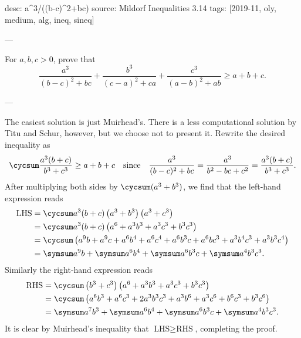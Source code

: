 desc: a^3/((b-c)^2+bc)
source: Mildorf Inequalities 3.14
tags: [2019-11, oly, medium, alg, ineq, sineq]

---

For $a,b,c>0$, prove that \[\frac{a^3}{(b-c)^2+bc}+\frac{b^3}{(c-a)^2+ca}+\frac{c^3}{(a-b)^2+ab}\ge a+b+c.\]

---

The easiest solution is just Muirhead's. There is a less computational solution by Titu and Schur, however, but we choose not to present it. Rewrite the desired inequality as \[\cycsum\frac{a^3(b+c)}{b^3+c^3}\ge a+b+c\quad\text{since}\quad\frac{a^3}{(b-c)^2+bc}=\frac{a^3}{b^2-bc+c^2}=\frac{a^3(b+c)}{b^3+c^3}.\]
After multiplying both sides by $\cycsum(a^3+b^3)$, we find that the left-hand expression reads
\begin{align*}
    \text{LHS}&=\cycsum a^3(b+c)\left(a^3+b^3\right)\left(a^3+c^3\right)\\
    &=\cycsum a^3(b+c)\left(a^6+a^3b^3+a^3c^3+b^3c^3\right)\\
    &=\cycsum\left(a^9b+a^9c+a^6b^4+a^6c^4+a^6b^3c+a^6bc^3+a^3b^4c^3+a^3b^3c^4\right)\\
    &=\symsum a^9b+\symsum a^6b^4+\symsum a^6b^3c+\symsum a^4b^3c^3.
\end{align*}
Similarly the right-hand expression reads
\begin{align*}
    \text{RHS}&=\cycsum\left(b^3+c^3\right)\left(a^6+a^3b^3+a^3c^3+b^3c^3\right)\\
    &=\cycsum\left(a^6b^3+a^6c^3+2a^3b^3c^3+a^3b^6+a^3c^6+b^6c^3+b^3c^6\right)\\
    &=\symsum a^7b^3+\symsum a^6b^4+\symsum a^6b^3c+\symsum a^4b^3c^3.
\end{align*}
It is clear by Muirhead's inequality that $\text{LHS}\ge\text{RHS}$, completing the proof.
